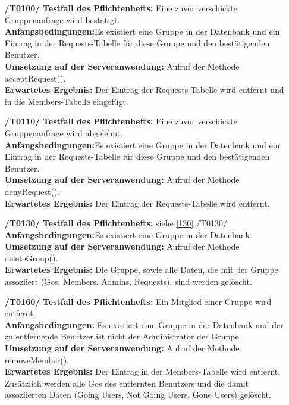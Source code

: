 \documentclass[11pt,a4paper]{scrartcl}
\begin{document}
\begin{enumerate}
	\item[\textbf{/T0100/}]
	\textbf{Testfall des Pflichtenhefts: }Eine zuvor verschickte Gruppenanfrage wird bestätigt.\\
	\textbf{Anfangsbedingungen:}Es existiert eine Gruppe in der Datenbank und ein Eintrag in der Requests-Tabelle für diese Gruppe und den bestätigenden Benutzer.\\
	\textbf{Umsetzung auf der Serveranwendung: }Aufruf der Methode acceptRequest().\\
	\textbf{Erwartetes Ergebnis: }Der Eintrag der Requests-Tabelle wird entfernt und in die Members-Tabelle eingefügt.
	
	\item[\textbf{/T0110/}]
	\textbf{Testfall des Pflichtenhefts: }Eine zuvor verschickte Gruppenanfrage wird abgelehnt.\\
	\textbf{Anfangsbedingungen:}Es existiert eine Gruppe in der Datenbank und ein Eintrag in der Requests-Tabelle für diese Gruppe und den bestätigenden Benutzer.\\
	\textbf{Umsetzung auf der Serveranwendung: }Aufruf der Methode denyRequest().\\
	\textbf{Erwartetes Ergebnis: }Der Eintrag der Requests-Tabelle wird entfernt.
	
	\item[\textbf{/T0130/}] \label{T130} 
	\textbf{Testfall des Pflichtenhefts: }siehe \ref{130} /T0130/\\
	\textbf{Anfangsbedingungen:}Es existiert eine Gruppe in der Datenbank\\
	\textbf{Umsetzung auf der Serveranwendung: }Aufruf der Methode deleteGroup().\\
	\textbf{Erwartetes Ergebnis: }Die Gruppe, sowie alle Daten, die mit der Gruppe assoziiert (Gos, Members, Admins, Requests), sind werden gelöscht.
	
	\item[\textbf{/T0160/}]
	\textbf{Testfall des Pflichtenhefts: }Ein Mitglied einer Gruppe wird entfernt.\\
	\textbf{Anfangsbedingungen: }Es existiert eine Gruppe in der Datenbank und der zu entfernende Benutzer ist nicht der Administrator der Gruppe.\\
	\textbf{Umsetzung auf der Serveranwendung: }Aufruf der Methode removeMember().\\
	\textbf{Erwartetes Ergebnis: }Der Eintrag in der Members-Tabelle wird entfernt. Zusätzlich werden alle Gos des entfernten Benutzers und die damit assoziierten Daten (Going Users, Not Going Users, Gone Users) gelöscht.
	

\end{enumerate}
\end{document}
